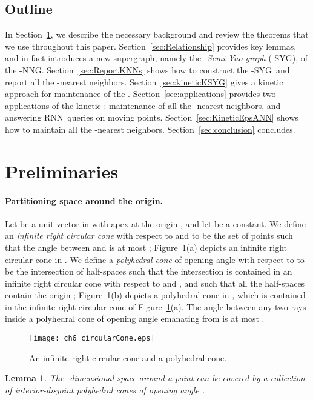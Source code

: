 \documentclass[preprint,12pt]{elsarticle}
\def\rknn{\mbox{RNN}}
\def\knng{\mbox{-NNG}}
\def\ksyg{\mbox{-SYG}}
\newtheorem{lemma}{Lemma}[section]
\begin{document}
\subsection{Outline}\label{sec:Outline} 
In Section~\ref{sec:Preliminaries}, we describe the necessary background and review the theorems that we use throughout this paper. Section~\ref{sec:Relationship} provides key lemmas, and in fact introduces a new supergraph, namely the \textit{-Semi-Yao graph} (\ksyg), of the \knng. Section~\ref{sec:ReportKNNs} shows how to construct the \ksyg~and report all the -nearest neighbors. Section~\ref{sec:kineticKSYG} gives a kinetic approach for maintenance of the . Section~\ref{sec:applications}  provides two applications of the kinetic : maintenance of all the -nearest neighbors, and answering \rknn~queries on moving points. Section~\ref{sec:KineticEpsANN} shows how to maintain all the -nearest neighbors. Section~\ref{sec:conclusion} concludes.

\section{Preliminaries}\label{sec:Preliminaries}
\paragraph{Partitioning space around the origin.}
Let  be a unit vector in  with apex at the origin , and let  be a constant. We define an \textit{infinite right circular cone} with respect to  and  to be the set of points  such that the angle between  and  is at most ; Figure~\ref{fig:circularCone}(a) depicts an infinite right circular cone in . We define a \textit{polyhedral cone} of opening angle  with respect to  to be the intersection of  half-spaces such that the intersection is contained in an infinite right circular cone with respect to  and , and such that all the half-spaces contain the origin ; Figure~\ref{fig:circularCone}(b) depicts a polyhedral cone in , which is contained in the infinite right circular cone of Figure~\ref{fig:circularCone}(a). The angle between any two rays inside a polyhedral cone of opening angle  emanating from  is at most .

\begin{figure}[t!]
\centering
\texttt{[image: ch6\_circularCone.eps]}
\caption{An infinite right circular cone and a polyhedral cone.}
\label{fig:circularCone}
\end{figure}

\begin{lemma}{\tt \cite{Abam:2011:KSX:1971362.1971367}}\label{the:NumofPolyCones}
The -dimensional space around a point can be covered by a collection of  interior-disjoint polyhedral cones of opening angle .
\end{lemma}
\end{document}
